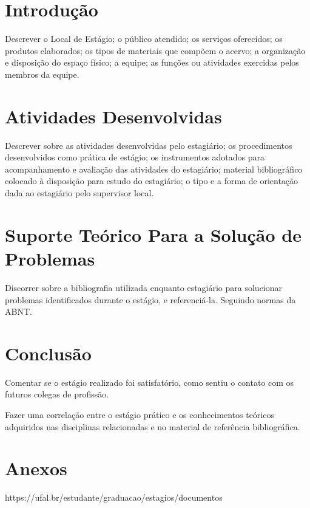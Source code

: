 \documentclass{myreport}
\begin{document}
\capa
\folhaDeRosto
\newpage
\tableofcontents
\newpage
\inicio
\chapter{Introdução}
Descrever o Local de Estágio; o público atendido; os serviços oferecidos; os produtos elaborados; os tipos de materiais que compõem o acervo; a organização e disposição do espaço físico; a equipe; as funções ou atividades exercidas pelos membros da equipe.

\chapter{Atividades Desenvolvidas}
Descrever sobre as atividades desenvolvidas pelo estagiário; os procedimentos desenvolvidos como prática de estágio; os instrumentos adotados para acompanhamento e avaliação das atividades do estagiário; material bibliográfico colocado à disposição para estudo do estagiário; o tipo e a forma de orientação dada ao estagiário pelo supervisor local.

\chapter{Suporte Teórico Para a Solução de Problemas}
Discorrer sobre a bibliografia utilizada enquanto estagiário para solucionar problemas identificados durante o estágio, e referenciá-la. Seguindo normas da ABNT.

\chapter{Conclusão}
Comentar se o estágio realizado foi satisfatório, como sentiu o contato com os futuros colegas de profissão.

Fazer uma correlação entre o estágio prático e os conhecimentos teóricos adquiridos nas disciplinas relacionadas e no material de referência bibliográfica.


\chapter{Anexos}
https://ufal.br/estudante/graduacao/estagios/documentos\cite{UFAL}
\end{document}
